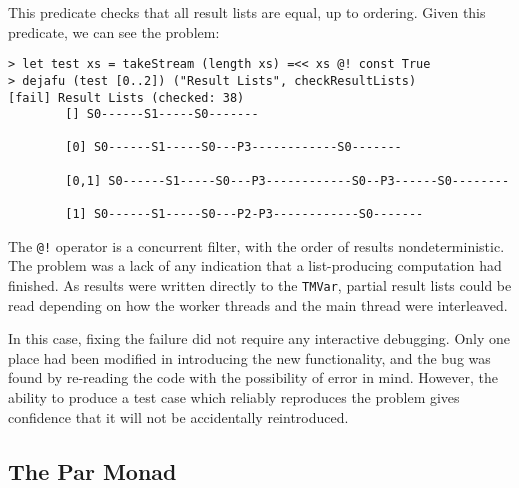 This \dejafu{} predicate checks that all result lists are equal, up to
ordering.  Given this predicate, we can see the problem:

\begin{verbatim}
> let test xs = takeStream (length xs) =<< xs @! const True
> dejafu (test [0..2]) ("Result Lists", checkResultLists)
[fail] Result Lists (checked: 38)
        [] S0------S1-----S0-------

        [0] S0------S1-----S0---P3------------S0-------

        [0,1] S0------S1-----S0---P3------------S0--P3------S0--------

        [1] S0------S1-----S0---P2-P3------------S0-------
\end{verbatim}

The \verb|@!| operator is a concurrent filter, with the order of
results nondeterministic.  The problem was a lack of any indication
that a list-producing computation had finished.  As results were
written directly to the \verb|TMVar|, partial result lists could be
read depending on how the worker threads and the main thread were
interleaved.

In this case, fixing the failure did not require any interactive
debugging.  Only one place had been modified in introducing the new
functionality, and the bug was found by re-reading the code with the
possibility of error in mind.  However, the ability to produce a test
case which reliably reproduces the problem gives confidence that it
will not be accidentally reintroduced.

\FloatBarrier
\subsection{The Par Monad}

